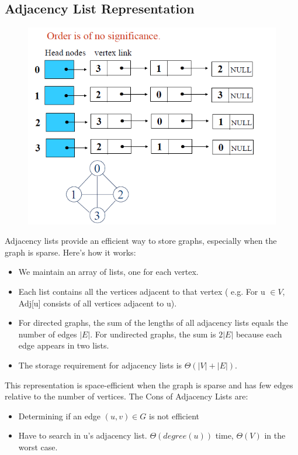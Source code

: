 \subsection{Adjacency List Representation}
\begin{figure}[h!]
    \centering
    \includegraphics[width=0.75\linewidth]{adjacency list representation.png}

\end{figure}
Adjacency lists provide an efficient way to store graphs, especially when the graph is sparse. Here's how it works:
\begin{itemize}
    \item We maintain an array of lists, one for each vertex.
    \item Each list contains all the vertices adjacent to that vertex ( e.g. For u $\in V$, Adj[u] consists of all vertices adjacent to u).
    \item For directed graphs, the sum of the lengths of all adjacency lists equals the number of edges $|E|$. For undirected graphs, the sum is $2|E|$ because each edge appears in two lists.
    \item The storage requirement for adjacency lists is $\Theta(|V| + |E|)$.
\end{itemize}
This representation is space-efficient when the graph is sparse and has few edges relative to the number of vertices. \newline
The Cons of Adjacency Lists are:
\begin{itemize}
    \item Determining if an edge $(u,v) \in G$ is not efficient
    \item Have to search in u’s adjacency list. $\Theta(degree(u))$ time, $\Theta(V)$ in the worst case.
\end{itemize}

